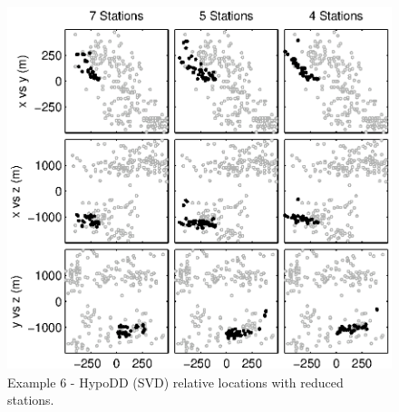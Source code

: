 \documentclass[extra, onecolumn, doublespacing]{gji}
\begin{document}


\begin{figure}
\includegraphics[height = 25pc]{Figure9_bw.eps}
\caption{Example 6 - HypoDD (SVD) relative locations with reduced
stations.} \label{fig-HYPODDreducesstats}
\end{figure}


\end{document}
